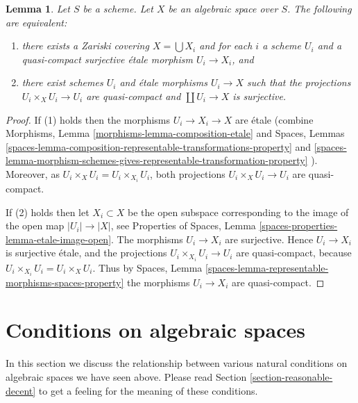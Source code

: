 \documentclass{stacks-project}
\theoremstyle{plain}
\newtheorem{lemma}[subsection]{Lemma}
\theoremstyle{definition}
\theoremstyle{remark}
\numberwithin{equation}{subsection}
\begin{document}
\begin{lemma}
\label{lemma-characterize-very-reasonable}
Let $S$ be a scheme.
Let $X$ be an algebraic space over $S$.
The following are equivalent:
\begin{enumerate}
\item there exists a Zariski covering $X = \bigcup X_i$ and for
each $i$ a scheme $U_i$ and a quasi-compact surjective \'etale
morphism $U_i \to X_i$, and
\item there exist schemes $U_i$ and \'etale morphisms $U_i \to X$
such that the projections $U_i \times_X U_i \to U_i$ are quasi-compact
and $\coprod U_i \to X$ is surjective.
\end{enumerate}
\end{lemma}

\begin{proof}
If (1) holds then the morphisms $U_i \to X_i \to X$ are \'etale (combine
Morphisms, Lemma \ref{morphisms-lemma-composition-etale}
and
Spaces, Lemmas
\ref{spaces-lemma-composition-representable-transformations-property} and
\ref{spaces-lemma-morphism-schemes-gives-representable-transformation-property}
).
Moreover, as $U_i \times_X U_i = U_i \times_{X_i} U_i$,
both projections $U_i \times_X U_i \to U_i$ are quasi-compact.

\medskip\noindent
If (2) holds then let $X_i \subset X$ be the open subspace corresponding
to the image of the open map $|U_i| \to |X|$, see
Properties of Spaces,
Lemma \ref{spaces-properties-lemma-etale-image-open}.
The morphisms $U_i \to X_i$ are surjective.
Hence $U_i \to X_i$ is surjective \'etale, and the projections
$U_i \times_{X_i} U_i \to U_i$ are quasi-compact, because
$U_i \times_{X_i} U_i = U_i \times_X U_i$. Thus by
Spaces, Lemma \ref{spaces-lemma-representable-morphisms-spaces-property}
the morphisms $U_i \to X_i$ are quasi-compact.
\end{proof}









\section{Conditions on algebraic spaces}
\label{section-conditions}

\noindent
In this section we discuss the relationship between various natural
conditions on algebraic spaces we have seen above. Please read
Section \ref{section-reasonable-decent}
to get a feeling for the meaning of these conditions.
\end{document}
